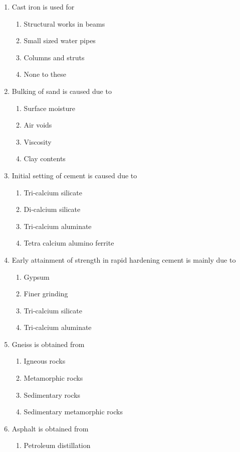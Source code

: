 \documentclass[11pt,a4paper]{article}
\begin{document}
\begin{enumerate}
\begin{enumerate}[label=\Alph*.]
\end{enumerate}
\item{Cast iron is used for}
\begin{enumerate}[label=\Alph*.]
\item{Structural works in beams}
\item{Small sized water pipes}
\item{Columns and struts}
\item{None to these}
\end{enumerate}
\item{Bulking of sand is caused due to}
\begin{enumerate}[label=\Alph*.]
\item{Surface moisture}
\item{Air voids}
\item{Viscosity}
\item{Clay contents}
\end{enumerate}
\item{Initial setting of cement is caused due to}
\begin{enumerate}[label=\Alph*.]
\item{Tri-calcium silicate}
\item{Di-calcium silicate}
\item{Tri-calcium aluminate}
\item{Tetra calcium alumino ferrite}
\end{enumerate}
\item{Early attainment of strength in rapid hardening cement is mainly due to}
\begin{enumerate}[label=\Alph*.]
\item{Gypsum}
\item{Finer grinding}
\item{Tri-calcium silicate}
\item{Tri-calcium aluminate}
\end{enumerate}
\item{Gneiss is obtained from}
\begin{enumerate}[label=\Alph*.]
\item{Igneous rocks}
\item{Metamorphic rocks}
\item{Sedimentary rocks}
\item{Sedimentary metamorphic rocks}
\end{enumerate}
\item{Asphalt is obtained from}
\begin{enumerate}[label=\Alph*.]
\item{Petroleum distillation}

\end{enumerate}
\end{enumerate}
\end{document}
